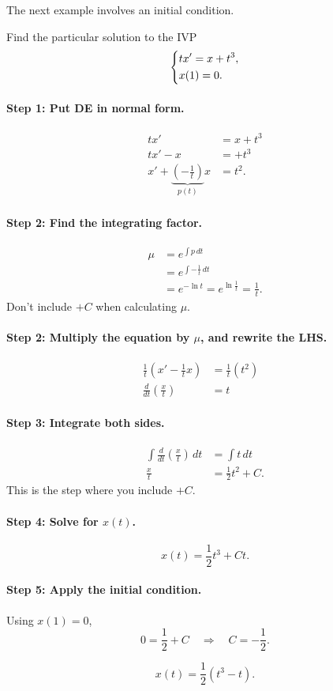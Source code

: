 \documentclass[10pt,letterpaper]{article}
\begin{document}
The next example involves an initial condition. 

\begin{example}[2]{
Find the particular solution to the IVP
\[
\begin{dcases}
tx' = x + t^3,\\
x(1)=0.
\end{dcases}
\]
}
\paragraph{Step 1: Put DE in normal form.}
\begin{align*}
tx' &= x + t^3\\
tx'-x &=  + t^3\\
x'+\underbrace{\left(-\frac{1}{t}\right)}_{p(t)}x &=   t^2.
\end{align*}

\paragraph{Step 2: Find the integrating factor.}
\begin{align*}
    \mu &= e^{\int p\,dt}\\
     &= e^{\int -\frac{1}{t}\,dt}\\
     &= e^{-\ln t}=e^{\ln \frac{1}{t}} = \tfrac{1}{t}.
\end{align*}
Don't include $+C$ when calculating $\mu$. 

\paragraph{Step 2: Multiply the equation by $\mu$, and rewrite the LHS.}
\begin{align*}
   \frac{1}{t}( x'-\frac{1}{t}x) &= \frac{1}{t}(t^2)          & \\
\frac{d}{dt}\!\left(\frac{x}{t}\right) &=t
\end{align*}

\paragraph{Step 3: Integrate both sides.}
\begin{align*}
   \int \frac{d}{dt}\!\left(\frac{x}{t}\right)\,dt &=\int t\,dt\\
\frac{x}{t} &=\frac{1}{2}t^2 + C.
\end{align*}
This is the step where you include $+C$.

\paragraph{Step 4: Solve for $x(t)$.}
\[
x(t) = \frac{1}{2}t^3 + Ct.
\]

\paragraph{Step 5: Apply the initial condition.}
Using $x(1)=0$,
\[
0 = \frac{1}{2} + C
\quad\Rightarrow\quad
C = -\frac{1}{2}.
\]

\[
\boxed{x(t) = \frac{1}{2}(t^3 - t).}
\]
\end{example}
\end{document}
